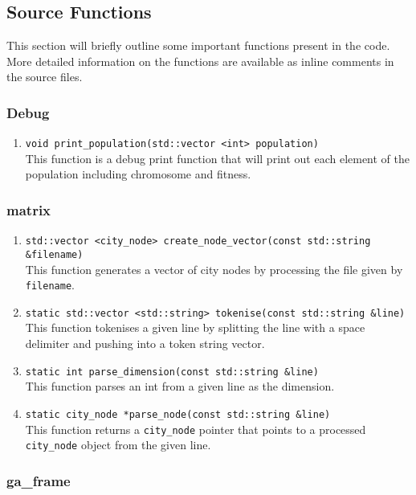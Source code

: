 \documentclass[12pt]{article}
\begin{document}
\subsection{Source Functions}
This section will briefly outline some important functions present in the code. More detailed information on the functions are available as inline comments in the source files.

\subsubsection{Debug}
\begin{enumerate}
	\item \texttt{void print\_population(std::vector <int> population)}\\
	This function is a debug print function that will print out each element of the population including chromosome and fitness.
\end{enumerate}

\subsubsection{matrix}
\begin{enumerate}
	\item \texttt{std::vector <city\_node> create\_node\_vector(const std::string \&filename)}\\
	This function generates a vector of city nodes by processing the file given by \texttt{filename}.
	
	\item \texttt{static std::vector <std::string> tokenise(const std::string \&line)}\\
	This function tokenises a given line by splitting the line with a space delimiter and pushing into a token string vector.
	
	\item \texttt{static int parse\_dimension(const std::string \&line)}\\
	This function parses an int from a given line as the dimension.
	
	\item \texttt{static city\_node *parse\_node(const std::string \&line)}\\
	This function returns a \texttt{city\_node} pointer that points to a processed \texttt{city\_node} object from the given line.
\end{enumerate}

\subsubsection{ga\_frame}
\end{document}
